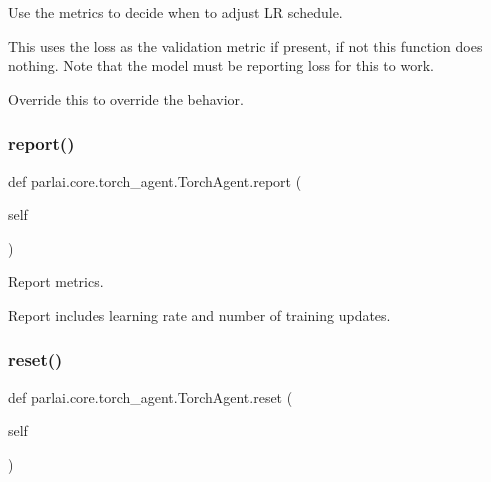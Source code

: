 \begin{DoxyVerb}Use the metrics to decide when to adjust LR schedule.

This uses the loss as the validation metric if present, if not this
function does nothing. Note that the model must be reporting loss for
this to work.

Override this to override the behavior.
\end{DoxyVerb}
 \mbox{\label{classparlai_1_1core_1_1torch__agent_1_1TorchAgent_ac694770cd4022eb047bf6fbb8f46035c}} 
\subsubsection{\texorpdfstring{report()}{report()}}
{\footnotesize\ttfamily def parlai.\+core.\+torch\+\_\+agent.\+Torch\+Agent.\+report (\begin{DoxyParamCaption}\item[{}]{self }\end{DoxyParamCaption})}

\begin{DoxyVerb}Report metrics.

Report includes learning rate and number of training updates.
\end{DoxyVerb}
 \mbox{\label{classparlai_1_1core_1_1torch__agent_1_1TorchAgent_a6f568650dd8e245a274671680ebb7587}} 
\subsubsection{\texorpdfstring{reset()}{reset()}}
{\footnotesize\ttfamily def parlai.\+core.\+torch\+\_\+agent.\+Torch\+Agent.\+reset (\begin{DoxyParamCaption}\item[{}]{self }\end{DoxyParamCaption})}


